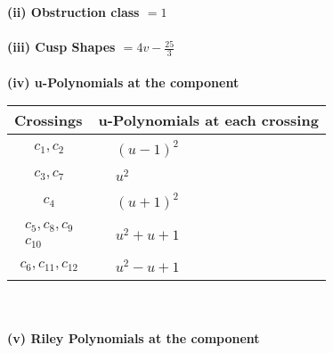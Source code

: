 \documentclass[1p]{elsarticle_modified}
\theoremstyle{definition}
\begin{document}
\flushleft \textbf{(ii) Obstruction class $= 1$}\\~\\
\flushleft \textbf{(iii) Cusp Shapes $= 4 v-\frac{25}{3}$}\\~\\
\newpage\renewcommand{\arraystretch}{1}
\flushleft \textbf{(iv) u-Polynomials at the component}\newline \\
\begin{tabular}{m{50pt}|m{274pt}}
Crossings & \hspace{64pt}u-Polynomials at each crossing \\
\hline $$\begin{aligned}c_{1},c_{2}\end{aligned}$$&$\begin{aligned}
&(u-1)^2
\end{aligned}$\\
\hline $$\begin{aligned}c_{3},c_{7}\end{aligned}$$&$\begin{aligned}
&u^2
\end{aligned}$\\
\hline $$\begin{aligned}c_{4}\end{aligned}$$&$\begin{aligned}
&(u+1)^2
\end{aligned}$\\
\hline $$\begin{aligned}c_{5},c_{8},c_{9}\\c_{10}\end{aligned}$$&$\begin{aligned}
&u^2+u+1
\end{aligned}$\\
\hline $$\begin{aligned}c_{6},c_{11},c_{12}\end{aligned}$$&$\begin{aligned}
&u^2- u+1
\end{aligned}$\\
\hline
\end{tabular}\\~\\
\newpage\renewcommand{\arraystretch}{1}
\flushleft \textbf{(v) Riley Polynomials at the component}\newline \\
\end{document}
